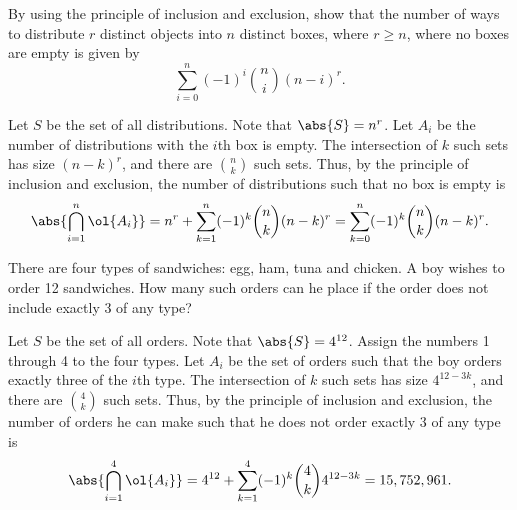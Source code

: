 \begin{problem}
    By using the principle of inclusion and exclusion, show that the number of ways to distribute $r$ distinct objects into $n$ distinct boxes, where $r \geq n$, where no boxes are empty is given by \[\sum_{i = 0}^n (-1)^i \binom{n}{i} (n-i)^r.\]
\end{problem}
\begin{solution}
    Let $S$ be the set of all distributions. Note that $\abs{S} = n^r$. Let $A_i$ be the number of distributions with the $i$th box is empty. The intersection of $k$ such sets has size $(n-k)^r$, and there are $\binom{n}{k}$ such sets. Thus, by the principle of inclusion and exclusion, the number of distributions such that no box is empty is \[\abs{\bigcap_{i = 1}^n \ol{A_i}} = n^r + \sum_{k = 1}^n (-1)^k \binom{n}{k} (n-k)^r = \sum_{k = 0}^n (-1)^k \binom{n}{k} (n-k)^r.\]
\end{solution}

\begin{problem}
    There are four types of sandwiches: egg, ham, tuna and chicken. A boy wishes to order 12 sandwiches. How many such orders can he place if the order does not include exactly 3 of any type?
\end{problem}
\begin{solution}
    Let $S$ be the set of all orders. Note that $\abs{S} = 4^{12}$. Assign the numbers 1 through 4 to the four types. Let $A_i$ be the set of orders such that the boy orders exactly three of the $i$th type. The intersection of $k$ such sets has size $4^{12-3k}$, and there are $\binom{4}{k}$ such sets. Thus, by the principle of inclusion and exclusion, the number of orders he can make such that he does not order exactly 3 of any type is \[\abs{\bigcap_{i = 1}^4 \ol{A_i}} = 4^{12} + \sum_{k = 1}^4 (-1)^k \binom{4}{k} 4^{12-3k} = 15,752,961.\]
\end{solution}